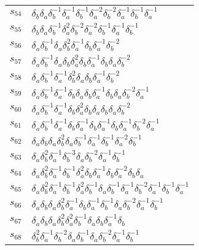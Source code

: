 \documentclass{article}
\begin{document}
\begin{center}
\begin{tabular}{ll}
$s_{54}$ & $\delta_b^{}\delta_a^{}\delta_b^{-1}\delta_a^{-1}\delta_b^{-1}\delta_a^{-2}\delta_b^{-2}\delta_a^{-1}\delta_b^{-1}\delta_a^{-1}$ \\
$s_{55}$ & $\delta_b^{}\delta_a^{}\delta_b^{-1}\delta_a^{2}\delta_b^{-2}\delta_a^{-2}\delta_b^{-1}\delta_a^{-1}\delta_b^{-1}$ \\
$s_{56}$ & $\delta_a^{}\delta_b^{-1}\delta_a^{}\delta_b^{2}\delta_a^{-1}\delta_b^{}\delta_a^{-1}\delta_b^{-2}$ \\
$s_{57}$ & $\delta_a^{}\delta_b^{-1}\delta_a^{}\delta_b^{}\delta_a^{2}\delta_b^{}\delta_a^{-1}\delta_b^{}\delta_a^{}\delta_b^{-2}$ \\
$s_{58}$ & $\delta_a^{}\delta_b^{-1}\delta_a^{-1}\delta_b^{2}\delta_a^{}\delta_b^{}\delta_a^{-1}\delta_b^{-2}$ \\
$s_{59}$ & $\delta_a^{}\delta_b^{-1}\delta_a^{-1}\delta_b^{}\delta_a^{}\delta_b^{}\delta_a^{-1}\delta_b^{}\delta_a^{}\delta_b^{-2}\delta_a^{-1}$ \\
$s_{60}$ & $\delta_a^{}\delta_b^{-1}\delta_a^{-1}\delta_b^{}\delta_a^{2}\delta_b^{}\delta_a^{}\delta_b^{}\delta_a^{}\delta_b^{-2}$ \\
$s_{61}$ & $\delta_a^{}\delta_b^{-1}\delta_a^{-1}\delta_b^{}\delta_a^{-1}\delta_b^{}\delta_a^{-1}\delta_b^{}\delta_a^{-1}\delta_b^{-2}\delta_a^{-1}$ \\
$s_{62}$ & $\delta_a^{}\delta_b^{}\delta_a^{}\delta_b^{2}\delta_a^{}\delta_b^{-1}\delta_a^{-1}\delta_b^{-1}\delta_a^{-2}\delta_b^{-1}$ \\
$s_{63}$ & $\delta_a^{}\delta_b^{2}\delta_a^{-1}\delta_b^{-3}\delta_a^{}\delta_b^{-2}\delta_a^{-1}\delta_b^{-1}$ \\
$s_{64}$ & $\delta_a^{}\delta_b^{2}\delta_a^{-1}\delta_b^{-1}\delta_a^{2}\delta_b^{}\delta_a^{-1}\delta_b^{}\delta_a^{-2}\delta_b^{}\delta_a^{}$ \\
$s_{65}$ & $\delta_a^{}\delta_b^{2}\delta_a^{-1}\delta_b^{-1}\delta_a^{2}\delta_b^{-1}\delta_a^{}\delta_b^{-1}\delta_a^{-1}\delta_b^{-2}\delta_a^{-1}\delta_b^{-1}\delta_a^{-1}$ \\
$s_{66}$ & $\delta_a^{}\delta_b^{}\delta_a^{}\delta_b^{2}\delta_a^{-1}\delta_b^{}\delta_a^{-1}\delta_b^{-1}\delta_a^{}\delta_b^{-2}\delta_a^{-1}\delta_b^{-1}$ \\
$s_{67}$ & $\delta_a^{}\delta_b^{}\delta_a^{}\delta_b^{2}\delta_a^{2}\delta_b^{-1}\delta_a^{}\delta_b^{}\delta_a^{-1}\delta_b^{}$ \\
$s_{68}$ & $\delta_b^{2}\delta_a^{-1}\delta_b^{-2}\delta_a^{}\delta_b^{-1}\delta_a^{}\delta_b^{-2}\delta_a^{-1}\delta_b^{-1}$ \\

\end{tabular}
\end{center}
\end{document}
